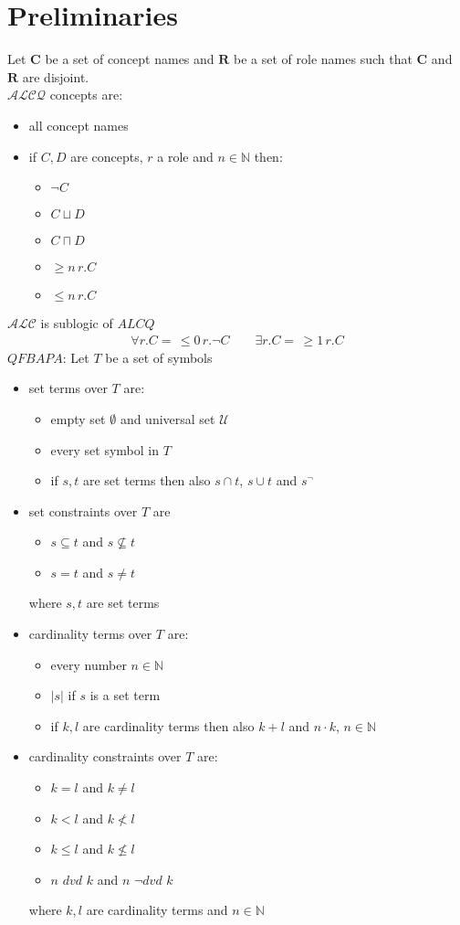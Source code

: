 \documentclass[a4paper,11pt]{scrartcl}
\theoremstyle{definition}
\begin{document}
\section{Preliminaries}
Let $\mathbf{C}$ be a set of concept names and $\mathbf{R}$ be a set of role names such that $\mathbf{C}$ and $\mathbf{R}$ are disjoint.\\
$\mathcal{ALCQ}$ concepts are:
\begin{itemize}
\item all concept names
\item if $C,D$ are concepts, $r$ a role and $n\in\mathbb{N}$ then:
\begin{itemize}
\item $\neg C$
\item $C\sqcup D$
\item $C\sqcap D$
\item $\geq n\, r.C$
\item $\leq n\, r.C$
\end{itemize}
\end{itemize}
$\mathcal{ALC}$ is sublogic of $ALCQ$
\begin{align*}
\forall r.C =\, \leq 0\,r.\neg C\quad\quad \exists r.C = \, \geq 1\, r.C
\end{align*}
$QFBAPA$: Let $T$ be a set of symbols
\begin{itemize}
\item set terms over $T$ are:
\begin{itemize}
\item empty set $\emptyset$ and universal set $
\mathcal{U}$
\item every set symbol in $T$
\item if $s,t$ are set terms then also $s\cap t$, $s\cup t$ and $s^{\neg}$
\end{itemize}
\item set constraints over $T$ are
\begin{itemize}
\item $s\subseteq t$ and $s\not\subseteq t$
\item $s=t$ and $s\neq t$
\end{itemize}
where $s,t$ are set terms
\item cardinality terms over $T$ are:
\begin{itemize}
\item every number $n\in \mathbb{N}$
\item $|s|$ if $s$ is a set term
\item if $k,l$ are cardinality terms then also $k+l$ and $n\cdot k$, $n\in \mathbb{N}$
\end{itemize}
\item cardinality constraints over $T$ are:
\begin{itemize}
\item $k=l$ and $k\neq l$
\item $k<l$ and $k\nless l$
\item $k\leq l$ and $k\not\leq l$
\item $n$ $dvd$ $k$ and $n$ $\neg dvd$ $k$
\end{itemize}
where $k,l$ are cardinality terms and $n\in\mathbb{N}$
\end{itemize}
\end{document}
